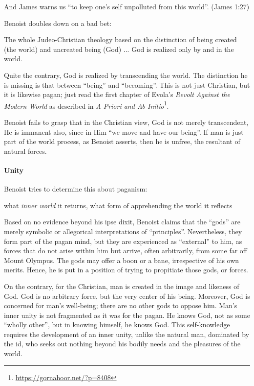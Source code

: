 And James warns us ``to keep one's self unpolluted from this world''. (James 1:27)

Benoist doubles down on a bad bet:

\begin{quotex}
The whole Judeo-Christian theology based on the distinction of being created (the world) and uncreated being (God) ... God is realized only by and in the world.
\end{quotex}


Quite the contrary, God is realized by transcending the world. The distinction he is missing is that between ``being'' and ``becoming''. This is not just Christian, but it is likewise pagan; just read the first chapter of Evola's \textit{Revolt Against the Modern World} as described in \textit{A Priori and Ab Initio}\footnote{\url{https://gornahoor.net/?p=8408}}.

Benoist fails to grasp that in the Christian view, God is not merely transcendent, He is immanent also, since in Him ``we move and have our being''. If man is just part of the world process, as Benoist asserts, then he is unfree, the resultant of natural forces.

\paragraph{Unity}


Benoist tries to determine this about paganism:

\begin{quotex}
what \emph{inner world} it returns, what form of apprehending the world it reflects
\end{quotex}


Based on no evidence beyond his ipse dixit, Benoist claims that the ``gods'' are merely symbolic or allegorical interpretations of ``principles''. Nevertheless, they form part of the pagan mind, but they are experienced as ``external'' to him, as forces that do not arise within him but arrive, often arbitrarily, from some far off Mount Olympus. The gods may offer a boon or a bane, irrespective of his own merits. Hence, he is put in a position of trying to propitiate those gods, or forces.

On the contrary, for the Christian, man is created in the image and likeness of God. God is no arbitrary force, but the very center of his being. Moreover, God is concerned for man's well-being; there are no other gods to oppose him. Man's inner unity is not fragmented as it was for the pagan. He knows God, not as some ``wholly other'', but in knowing himself, he knows God. This self-knowledge requires the development of an inner unity, unlike the natural man, dominated by the id, who seeks out nothing beyond his bodily needs and the pleasures of the world.

